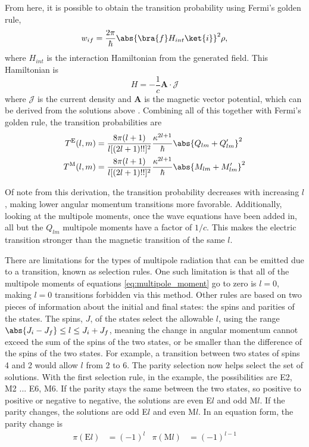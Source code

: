 From here, it is possible to obtain the transition probability using Fermi's golden rule,
\begin{equation}
    \label{eq:golden}
    w_{if}=\frac{2\pi}{\hbar}\abs{\bra{f}H_{int}\ket{i}}^2\rho,
\end{equation}
where $H_{int}$ is the interaction Hamiltonian from the generated field. This Hamiltonian is
\begin{equation}
    H = -\frac{1}{c}\boldsymbol{A}\cdot\mathcal{J}
\end{equation}
where $\mathcal{J}$ is the current density and $\boldsymbol{A}$ is the magnetic vector potential, which can be derived from the solutions above \citep{wong90:_nuclear}. Combining all of this together with Fermi's golden rule, the transition probabilities are
\begin{subequations}
\begin{align}
    T^\text{E}(l,m) & = \frac{8\pi(l+1)}{l[(2l+1)!!]^2}\frac{\kappa^{2l+1}}{\hbar}\abs{Q_{lm}+Q'_{lm}}^2 \\
    T^\text{M}(l,m) & = \frac{8\pi(l+1)}{l[(2l+1)!!]^2}\frac{\kappa^{2l+1}}{\hbar}\abs{M_{lm}+M'_{lm}}^2
\end{align}
\end{subequations}

Of note from this derivation, the transition probability decreases with increasing $l$, making lower angular momentum transitions more favorable. Additionally, looking at the multipole moments, once the wave equations have been added in, all but the $Q_{lm}$ multipole moments have a factor of $1/c$. This makes the electric transition stronger than the magnetic transition of the same $l$.

There are limitations for the types of multipole radiation that can be emitted due to a transition, known as selection rules. One such limitation is that all of the multipole moments of equations \ref{eq:multipole_moment} go to zero is $l=0$, making $l=0$ transitions forbidden via this method. Other rules are based on two pieces of information about the initial and final states: the spins and parities of the states. The spins, $J$, of the states select the allowable $l$, using the range $\abs{J_i-J_f}\leq l\leq J_i+J_f$, meaning the change in angular momentum cannot exceed the sum of the spins of the two states, or be smaller than the difference of the spins of the two states. For example, a transition between two states of spins 4 and 2 would allow $l$ from 2 to 6. The parity selection now helps select the set of solutions. With the first selection rule, in the example, the possibilities are E2, M2 ... E6, M6. If the parity stays the same between the two states, so positive to positive or negative to negative, the solutions are even E$l$ and odd M$l$. If the parity changes, the solutions are odd E$l$ and even M$l$. In an equation form, the parity change is
\begin{align}
    \pi(\text{E}l) &= (-1)^{l} & \pi(\text{M}l) &= (-1)^{l-1}
\end{align}

